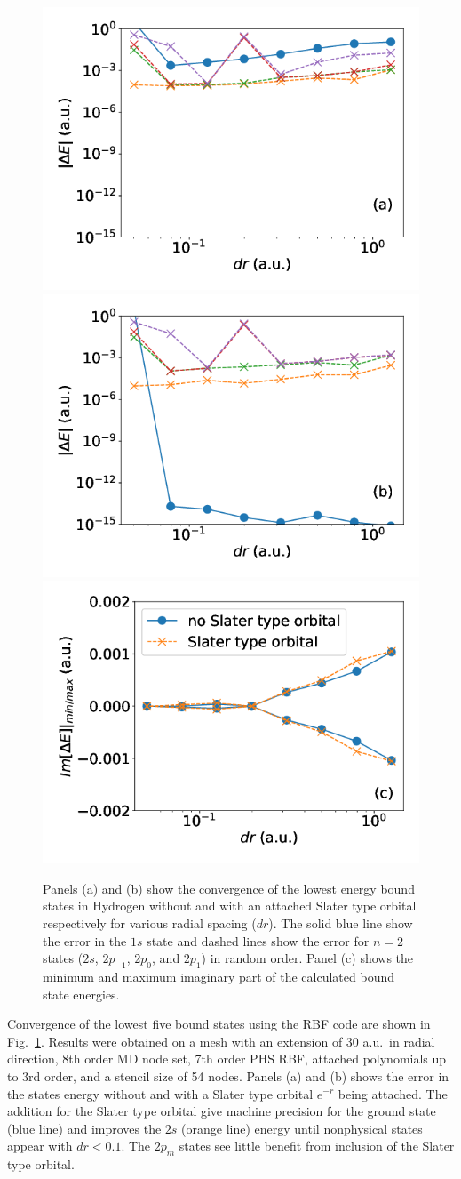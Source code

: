 \begin{figure}[t]
\centering
   \includegraphics[width=0.32\linewidth]{figs/rbf_no_exp.png}
    \includegraphics[width=0.32\linewidth]{figs/rbf_with_exp.png}
    \includegraphics[width=0.32\linewidth]{figs/rbf_imag.png}
   
\caption{Panels (a) and (b) show the convergence of the lowest energy bound states in Hydrogen without and with an attached Slater type orbital respectively for various radial spacing ($dr$). The solid blue line show the error in the $1s$ state and dashed lines show the error for $n=2$ states ($2s$, $2p_{-1}$, $2p_{0}$, and $2p_{1}$) in random order. Panel (c) shows the minimum and maximum imaginary part of the calculated bound state energies.
} 
  \label{fig:rbf_conver}
\end{figure}

Convergence of the lowest five bound states using the RBF code are shown in Fig.~\ref{fig:rbf_conver}. Results were obtained on a mesh with an extension of 30 a.u.\ in radial direction, 8th order MD node set, 7th order PHS RBF, attached polynomials up to 3rd order, and a stencil size of 54 nodes. Panels (a) and (b) shows the error in the  states energy without and with a Slater type orbital $e^{-r}$ being attached. The addition for the Slater type orbital give machine precision for the ground state (blue line) and improves the $2s$ (orange line) energy until nonphysical states appear with $dr<0.1$. The $2p_m$ states see little benefit from inclusion of the Slater type orbital.

